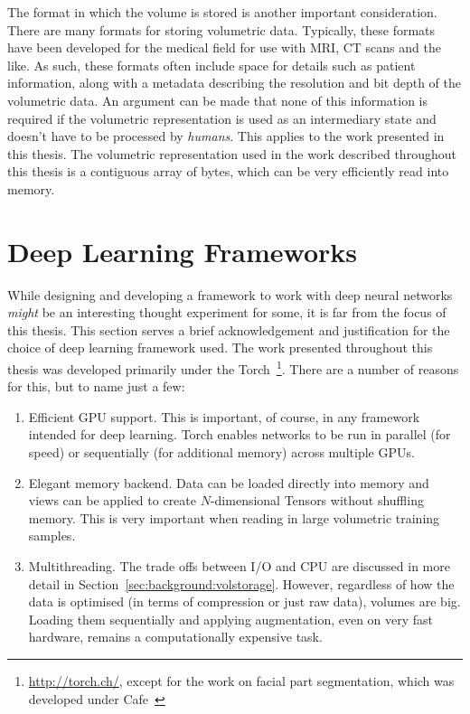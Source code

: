 The format in which the volume is stored is another important
consideration. There are many formats for storing volumetric
data. Typically, these formats have been developed for the medical
field for use with MRI, CT scans and the like. As such, these formats
often include space for details such as patient information, along
with a metadata describing the resolution and bit depth of the
volumetric data. An argument can be made that none of this information
is required if the volumetric representation is used as an
intermediary state and doesn't have to be processed by
\textit{humans}. This applies to the work presented in this
thesis. The volumetric representation used in the work described
throughout this thesis is a contiguous array of bytes, which can be
very efficiently read into memory.

\section{Deep Learning Frameworks}

While designing and developing a framework to work with deep neural
networks \textit{might} be an interesting thought experiment for some,
it is far from the focus of this thesis. This section serves a brief
acknowledgement and justification for the choice of deep learning
framework used. The work presented throughout this thesis was
developed primarily under the Torch~\footnote{\url{http://torch.ch/},
  except for the work on facial part segmentation, which was developed
  under Cafe~\cite{jia2014caffe}}. There are a number of reasons for
this, but to name just a few:

\begin{enumerate}
\item Efficient GPU support. This is important, of course, in any
  framework intended for deep learning. Torch enables networks to be
  run in parallel (for speed) or sequentially (for additional memory)
  across multiple GPUs.
\item Elegant memory backend. Data can be loaded directly into memory
  and views can be applied to create $N$-dimensional Tensors without
  shuffling memory. This is very important when reading in large
  volumetric training samples.
\item Multithreading. The trade offs between I/O and CPU are discussed
  in more detail in Section~\ref{sec:background:volstorage}. However,
  regardless of how the data is optimised (in terms of compression or
  just raw data), volumes are big. Loading them sequentially and
  applying augmentation, even on very fast hardware, remains a
  computationally expensive task.
\end{enumerate}


